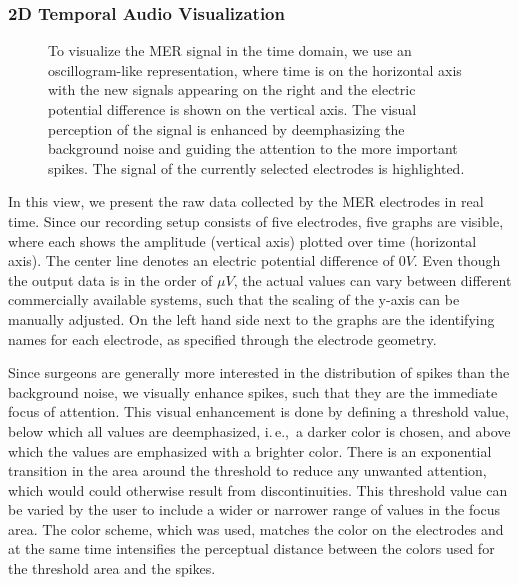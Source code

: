\documentclass{vgtc}                          %
\begin{document}
\subsubsection{2D Temporal Audio Visualization}\label{sec:overview:recording:mer}
\begin{figure}[b]
    \centering
    \caption{To visualize the MER signal in the time domain, we use an oscillogram-like representation, where time is on the horizontal axis with the new signals appearing on the right and the electric potential difference is shown on the vertical axis. The visual perception of the signal is enhanced by deemphasizing the background noise and guiding the attention to the more important spikes. The signal of the currently selected electrodes is highlighted.}
    \label{fig:recordingphase:sound}
\end{figure}

In this view, we present the raw data collected by the MER electrodes in real time. Since our recording setup consists of five electrodes, five graphs are visible, where each shows the amplitude (vertical axis) plotted over time (horizontal axis). The center line denotes an electric potential difference of $0V$. Even though the output data is in the order of $\mu V$, the actual values can vary between different commercially available systems, such that the scaling of the y-axis can be manually adjusted. On the left hand side next to the graphs are the identifying names for each electrode, as specified through the electrode geometry.

Since surgeons are generally more interested in the distribution of spikes than the background noise, we visually enhance spikes, such that they are the immediate focus of attention. This visual enhancement is done by defining a threshold value, below which all values are deemphasized, i.\,e.,~a darker color is chosen, and above which the values are emphasized with a brighter color. There is an exponential transition in the area around the threshold to reduce any unwanted attention, which would could otherwise result from discontinuities. This threshold value can be varied by the user to include a wider or narrower range of values in the focus area. The color scheme, which was used, matches the color on the electrodes and at the same time intensifies the perceptual distance between the colors used for the threshold area and the spikes.
\end{document}
